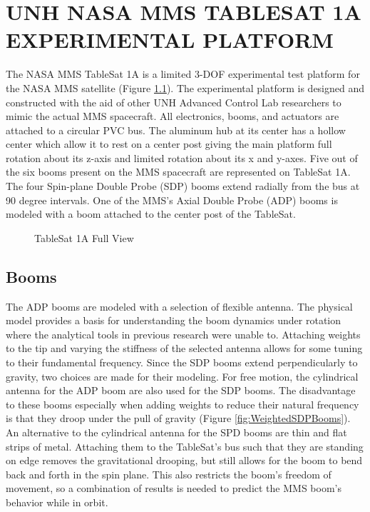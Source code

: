 
\chapter{UNH NASA MMS TABLESAT 1A EXPERIMENTAL PLATFORM}
\label{chap:UNHTableSat1A}

The NASA MMS TableSat 1A is a limited 3-DOF experimental test platform for the NASA MMS satellite (Figure \ref{fig:TSatFullView}).  The experimental platform is designed and constructed with the aid of other UNH Advanced Control Lab researchers to mimic the actual MMS spacecraft.  All electronics, booms, and actuators are attached to a circular PVC bus.  The aluminum hub at its center has a hollow center which allow it to rest on a center post giving the main platform full rotation about its z-axis and limited rotation about its x and y-axes.  Five out of the six booms present on the MMS spacecraft are represented on TableSat 1A.  The four Spin-plane Double Probe (SDP) booms extend radially from the bus at 90 degree intervals.  One of the MMS's Axial Double Probe (ADP) booms is modeled with a boom attached to the center post of the TableSat.

\begin{figure}[H]
  \centerline{}
  \caption{TableSat 1A Full View}
  \label{fig:TSatFullView}
\end{figure}

\section{Booms}
\label{sec:Booms}

The ADP booms are modeled with a selection of flexible antenna.  The physical model provides a basis for understanding the boom dynamics under rotation where the analytical tools in previous research \cite{mushawehthesis} were unable to.  Attaching weights to the tip and varying the stiffness of the selected antenna allows for some tuning to their fundamental frequency.  Since the SDP booms extend perpendicularly to gravity, two choices are made for their modeling.  For free motion, the cylindrical antenna for the ADP boom are also used for the SDP booms.  The disadvantage to these booms especially when adding weights to reduce their natural frequency is that they droop under the pull of gravity (Figure \ref{fig:WeightedSDPBooms}).  An alternative to the cylindrical antenna for the SPD booms are thin and flat strips of metal.  Attaching them to the TableSat's bus such that they are standing on edge removes the gravitational drooping, but still allows for the boom to bend back and forth in the spin plane.  This also restricts the boom's freedom of movement, so a combination of results is needed to predict the MMS boom's behavior while in orbit.


